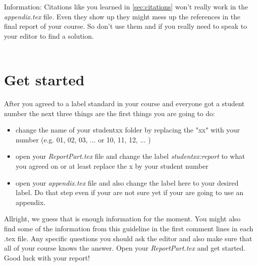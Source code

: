\documentclass[12pt,a4paper,notitlepage]{scrreprt}
\begin{document}
Information: Citations like you learned in \autoref{sec:citations} won't really work in the \textit{appendix.tex} file. Even they show up they might mess up the references in the final report of your course. So don't use them and if you really need to speak to your editor to find a solution.\\\\

\section{Get started}
After you agreed to a label standard in your course and everyone got a student number the next three things are the first things you are going to do:
\begin{itemize}
	\item change the name of your studentxx folder by replacing the "xx" with your number (e.g. 01, 02, 03, ... or  10, 11, 12, ... )
	\item open your \textit{ReportPart.tex} file and change the label \textit{studentxx:report} to what you agreed on or at least replace the x by your student number
	\item open your \textit{appendix.tex} file and also change the label here to your desired label. Do that step even if your are not sure yet if your are going to use an appendix.
\end{itemize}

Allright, we guess that is enough information for the moment. You might also find some of the information from this guideline in the first comment lines in each .tex file. Any specific questions you should ask the editor and also make sure that all of your course knows the answer. Open your \textit{ReportPart.tex} and get started. Good luck with your report! 
\end{document}
